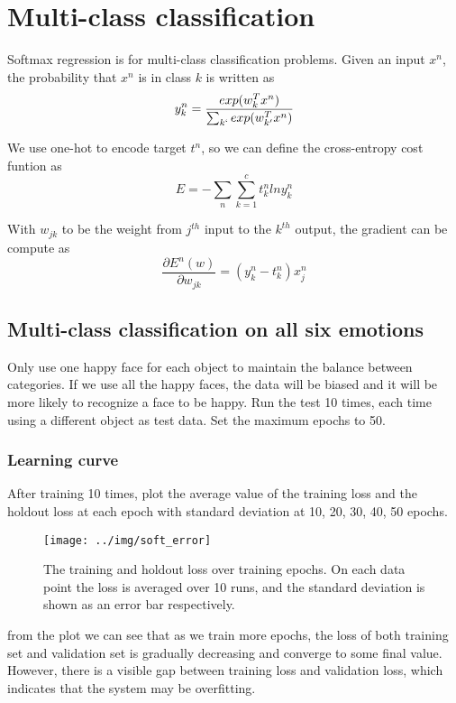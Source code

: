 \documentclass{article} %
\begin{document}
\section{Multi-class classification}
Softmax regression is for multi-class classification problems. Given an input $x^n$, the probability that $x^n$ is in class $k$ is written as
\begin{equation}
	y^n_k=\frac{exp(w^T_kx^n)}{\sum_{k`}exp(w^T_{k'}x^n) }
\end{equation}

We use one-hot to encode target $t^n$, so we can deﬁne the cross-entropy cost funtion as 
\begin{equation}
	E=-\sum\limits_{n}\sum\limits_{k=1}^{c} t^n_klny^n_k 
\end{equation}

With $w_{jk}$ to be the weight from $j^{th}$ input to the $k^{th}$ output, the gradient can be compute as
\begin{equation}
\frac{\partial E^n(w)}{\partial w_{jk}}=(y^n_k-t^n_k)x^n_j
\end{equation}


\subsection{Multi-class classification on all six emotions}
Only use one happy face for each object to maintain the balance between categories. If we use all the happy faces, the data will be biased and it will be more likely to recognize a face to be happy. Run the test 10 times, each time using a different object as test data. Set the maximum epochs to 50.


\subsubsection{Learning curve}
After training 10 times, plot the average value of the training loss and the holdout loss at each epoch with standard deviation at 10, 20, 30, 40, 50 epochs.

\begin{figure}[h]
\centering
\texttt{[image: ../img/soft\_error]}
\caption{The training and holdout loss over training epochs. On each data point the loss is averaged over 10 runs, and the standard deviation is shown as an error bar respectively.}
\label{fig:soft_error}
\end{figure}

from the plot we can see that as we train more epochs, the loss of both
training set and validation set is gradually decreasing and converge to some final value. However, there is a visible gap between training loss and validation loss, which indicates that the system may be overfitting.
\end{document}
